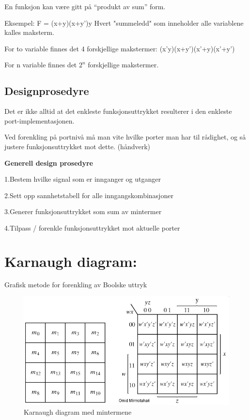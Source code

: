 \documentclass{article}
\begin{document}
	En funksjon kan være gitt på “produkt av sum” form.
	
	Eksempel: F = (x+y)(x+y')y 
	Hvert "summeledd" som inneholder alle variablene kalles maksterm.
	
	For to variable finnes det 4 forskjellige makstermer:
	(x'y)(x+y')(x'+y)(x'+y')
	
	For n variable finnes det $2^n$ forskjellige makstermer.
	
	\subsection{Designprosedyre }
	
	Det er ikke alltid at det enkleste funksjonsuttrykket resulterer i den enkleste port-implementasjonen.
	
	Ved forenkling på portnivå må man vite hvilke porter man har til rådighet, og så justere funksjonsuttrykket mot dette. (håndverk) 
	
	\textbf{Generell design	prosedyre}
	
	1.Bestem hvilke signal som er innganger og 
	utganger
	
	2.Sett opp sannhetstabell for alle 
	inngangskombinasjoner
	
	3.Generer funksjonsuttrykket som sum av 
	mintermer 
	
	4.Tilpass / forenkle funksjonsuttrykket mot 
	aktuelle porter 
	
	\section{Karnaugh diagram:}
	Grafisk metode for forenkling av Boolske uttryk
	\begin{figure}[H]
		\includegraphics[scale = 0.6]{KarnaD.jpg}
		\caption{Karnaugh diagram med mintermene}
	\end{figure}
	
\end{document}
